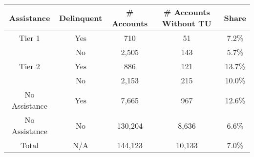 \begin{tabular}{ccccc}
\toprule 
\midrule 
Assistance & Delinquent & \# Accounts & \# Accounts Without TU & Share \\
\midrule 
Tier 1 & Yes & 710 & 51 & 7.2\% \\
 & No & 2,505 & 143 & 5.7\% \\
\midrule 
Tier 2 & Yes & 886 & 121 & 13.7\% \\
 & No & 2,153 & 215 & 10.0\% \\
\midrule 
No Assistance & Yes & 7,665 & 967 & 12.6\% \\
No Assistance & No & 130,204 & 8,636 & 6.6\% \\
\midrule 
Total & N/A & 144,123 & 10,133 & 7.0\% \\
\midrule 
\bottomrule 
\end{tabular}
